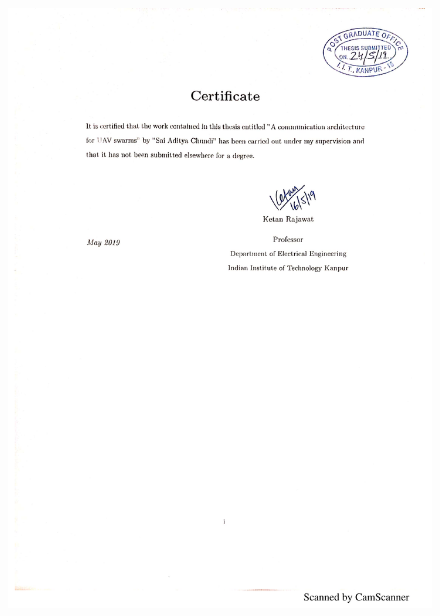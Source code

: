 \documentclass[11pt, a4paper, oneside]{Thesis} %
\begin{document}
\begin{figure}
	\centering
	\includegraphics[scale=1]{certificate1.pdf}
\end{figure}
\clearpage
\end{document}
